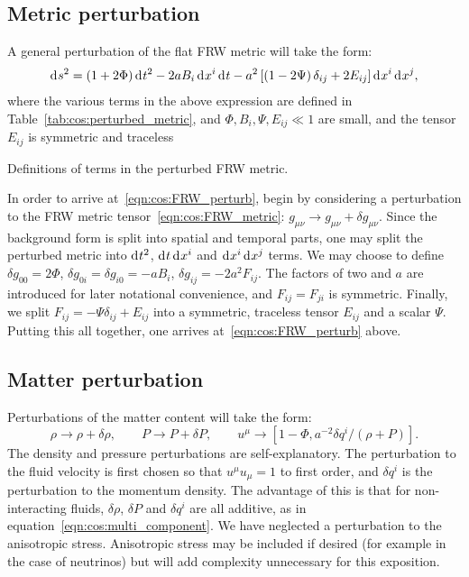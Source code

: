 \subsection{Metric perturbation}
A general perturbation of the flat FRW metric will take the form:
\begin{equation}
  \operatorname{d}^{}\!{s}^2 = (1+2\Phi)\operatorname{d}^{}\!{t}^2 -2a B_i \operatorname{d}^{}\!{x}^i \operatorname{d}^{}\!{t}  -a^2 \left[ \left( 1 - 2 \Psi \right)\delta_{ij} + 2E_{ij} \right] \operatorname{d}^{}\!{x}^i \operatorname{d}^{}\!{x}^j,
  \label{eqn:cos:FRW_perturb}
\end{equation}
where the various terms in the above expression are defined in Table~\ref{tab:cos:perturbed_metric}, and \({\Phi,B_i,\Psi,E_{ij}\ll1}\) are small, and the tensor $E_{ij}$ is symmetric and traceless
\begin{table}[tp]
  \centering
  
  \caption{Definitions of terms in the perturbed FRW metric.}\label{tab:cos:perturbed_metric}
\end{table}

In order to arrive at~\eqref{eqn:cos:FRW_perturb}, begin by considering a perturbation to the FRW metric tensor~\eqref{eqn:cos:FRW_metric}: \({g_{\mu\nu} \rightarrow g_{\mu\nu} + \delta g_{\mu\nu}}\). Since the background form is split into spatial and temporal parts, one may split the perturbed metric into \(\operatorname{d}^{}\!{t}^2\), \(\operatorname{d}^{}\!{t}\operatorname{d}^{}\!{x^i}\) and \(\operatorname{d}^{}\!{x^i}\operatorname{d}^{}\!{x^j}\) terms. We may choose to define \({\delta g_{00} = 2\Phi}\), \({\delta g_{0i} = \delta g_{i0} = -a B_i}\), \({\delta g_{ij} = -2a^2F_{ij}}\). The factors of two and \(a\) are introduced for later notational convenience, and \({F_{ij} = F_{ji}}\) is symmetric. Finally, we split \({F_{ij} = -\Psi\delta_{ij} + E_{ij}}\) into a symmetric, traceless tensor \(E_{ij}\) and a scalar \(\Psi\). Putting this all together, one arrives at~\eqref{eqn:cos:FRW_perturb} above.

\subsection{Matter perturbation}
Perturbations of the matter content will take the form:
\begin{equation}
  \rho \rightarrow \rho + \delta \rho, \qquad 
  P \rightarrow P + \delta P, \qquad
  u^\mu \rightarrow \left[ 1-\Phi, a^{-2} \delta q^i/(\rho+P)\right].
  \label{eqn:cos:matter_perturb}
\end{equation}
The density and pressure perturbations are self-explanatory. The perturbation to the fluid velocity is first chosen so that \(u^\mu u_\mu=1\) to first order, and \(\delta q^i\) is the perturbation to the momentum density. The advantage of this is that for non-interacting fluids, \(\delta\rho\), \(\delta P\) and \(\delta q^i\) are all additive, as in equation~\eqref{eqn:cos:multi_component}. We have neglected a perturbation to the anisotropic stress. Anisotropic stress may be included if desired (for example in the case of neutrinos) but will add complexity unnecessary for this exposition. 

